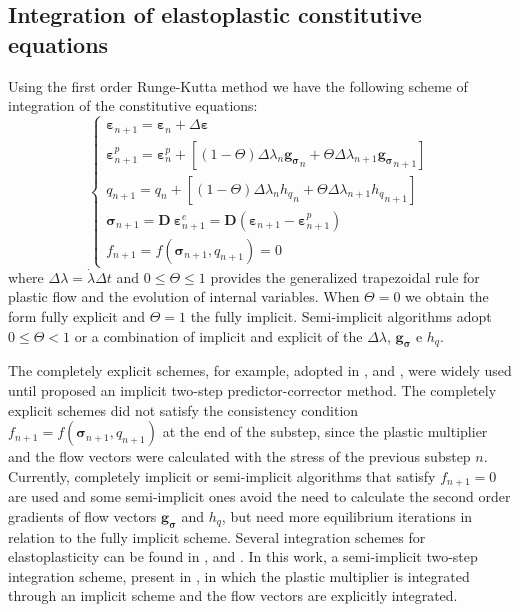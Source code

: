\documentclass[Journal,letterpaper]{ascelike-new}
\newcommand{\Dsdee}{\boldsymbol{D}}
\newcommand{\hl}{{h_q}}
\newcommand{\dgds}{\boldsymbol{g_\sigma}}
\newcommand{\strain}{\boldsymbol{\varepsilon}}
\newcommand{\stress}{\boldsymbol{\sigma}}
\begin{document}
\subsection{Integration of elastoplastic constitutive equations}

Using the first order Runge-Kutta method we have the following scheme of integration of the constitutive equations:
\begin{equation}
	\label{eq:esquema_int_constitutiva_ep}
	\left\{
\begin{array}{lcl}
	\strain_{n+1} = \strain_n + \Delta \strain \\
	\strain_{n+1}^p = \strain_n^p + \left[(1-\Theta) \Delta \lambda_n \dgds_n + \Theta \Delta \lambda_{n+1} \dgds_{n+1}\right] \\
	q_{n+1} = q_n + \left[(1-\Theta) \Delta \lambda_n \hl_n + \Theta \Delta \lambda_{n+1} \hl_{n+1}\right] \\	
	\stress_{n+1} = \Dsdee~\strain_{n+1}^e = \Dsdee( \strain_{n+1} - \strain_{n+1}^p) \\
	f_{n+1} = f(\stress_{n+1},q_{n+1}) = 0		
\end{array}
\right.
\end{equation}
where $\Delta \lambda = \dot\lambda\Delta t$ and $0 \leq \Theta \leq 1$ provides the generalized trapezoidal rule for  plastic flow and the evolution of internal variables. When $\Theta = 0$ we obtain the form fully explicit and $\Theta = 1$ the fully implicit. Semi-implicit algorithms adopt $0 \leq \Theta < 1$ or a combination of implicit and explicit of the $\Delta \lambda$, $\dgds$ e $\hl$. 

The completely explicit schemes, for example, adopted in ,  and , were widely used until  proposed an implicit two-step predictor-corrector method. The completely explicit schemes did not satisfy the consistency condition $f_{n+1}=f(\stress_{n+1},q_{n+1})$ at the end of the substep, since the plastic multiplier and the flow vectors were calculated with the stress of the previous substep $n$. Currently, completely implicit or semi-implicit algorithms that satisfy $f_{n+1} = 0$ are used and some semi-implicit ones avoid the need to calculate the second order gradients of flow vectors $\dgds$ and $\hl$, but need more equilibrium iterations in relation to the fully implicit scheme. Several integration schemes for elastoplasticity can be found in ,  and . In this work, a semi-implicit two-step integration scheme, present in , in which the plastic multiplier is integrated through an implicit scheme and the flow vectors are explicitly integrated.
\end{document}
